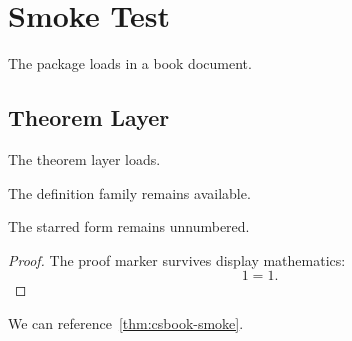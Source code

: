 \documentclass{book}
\begin{document}
\chapter{Smoke Test}
 The package loads in a book document.
\section{Theorem Layer}
\begin{theorem}\label{thm:csbook-smoke}The theorem layer loads.\end{theorem}
\begin{definition}The definition family remains available.\end{definition}
\begin{theorem*}The starred form remains unnumbered.\end{theorem*}
\begin{proof}The proof marker survives display mathematics:
\[
	1=1.
\]
\end{proof}
We can reference~\cref{thm:csbook-smoke}.
\end{document}
